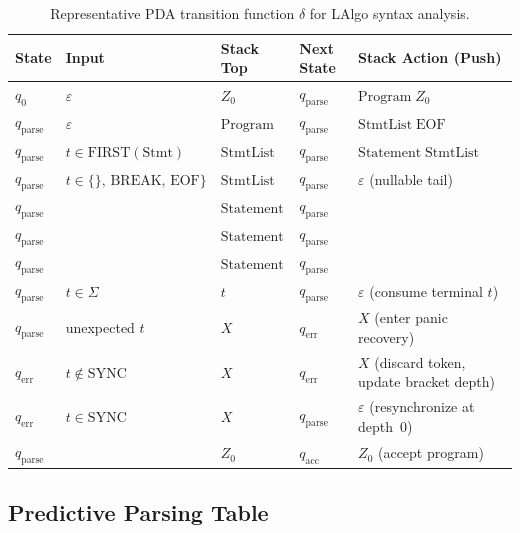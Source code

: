\begin{table}[H]
\centering
\small
\begin{tabularx}{\linewidth}{@{}L{15mm} L{30mm} L{26mm} L{17mm} Y@{}}
\toprule
\textbf{State} & \textbf{Input} & \textbf{Stack Top} & \textbf{Next State} & \textbf{Stack Action (Push)} \\
\midrule
$q_0$ & $\varepsilon$ & $Z_0$ & $q_{\mathrm{parse}}$ & $\mathrm{Program}\; Z_0$ \\
$q_{\mathrm{parse}}$ & $\varepsilon$ & $\mathrm{Program}$ & $q_{\mathrm{parse}}$ & $\mathrm{StmtList}\; \mathrm{EOF}$ \\
$q_{\mathrm{parse}}$ & $t \in \mathrm{FIRST}(\mathrm{Stmt})$ & $\mathrm{StmtList}$ & $q_{\mathrm{parse}}$ & $\mathrm{Statement}\; \mathrm{StmtList}$ \\
$q_{\mathrm{parse}}$ & $t \in \{\mathrm{\}},\, \mathrm{BREAK},\, \mathrm{EOF}\}$ & $\mathrm{StmtList}$ & $q_{\mathrm{parse}}$ & $\varepsilon$ (nullable tail) \\
$q_{\mathrm{parse}}$ &  & $\mathrm{Statement}$ & $q_{\mathrm{parse}}$ &  \\
$q_{\mathrm{parse}}$ &  & $\mathrm{Statement}$ & $q_{\mathrm{parse}}$ &  \\
$q_{\mathrm{parse}}$ &  & $\mathrm{Statement}$ & $q_{\mathrm{parse}}$ &  \\
$q_{\mathrm{parse}}$ & $t \in \Sigma$ & $t$ & $q_{\mathrm{parse}}$ & $\varepsilon$ (consume terminal $t$) \\
$q_{\mathrm{parse}}$ & unexpected $t$ & $X$ & $q_{\mathrm{err}}$ & $X$ (enter panic recovery) \\
$q_{\mathrm{err}}$ & $t \notin \mathrm{SYNC}$ & $X$ & $q_{\mathrm{err}}$ & $X$ (discard token, update bracket depth) \\
$q_{\mathrm{err}}$ & $t \in \mathrm{SYNC}$ & $X$ & $q_{\mathrm{parse}}$ & $\varepsilon$ (resynchronize at depth~0) \\
$q_{\mathrm{parse}}$ &  & $Z_0$ & $q_{\mathrm{acc}}$ & $Z_0$ (accept program) \\
\bottomrule
\end{tabularx}
\caption{Representative PDA transition function $\delta$ for LAlgo syntax analysis.}
\label{tab:pda-transitions}
\end{table}

\subsection{Predictive Parsing Table}
\label{sec:parsing-table}

